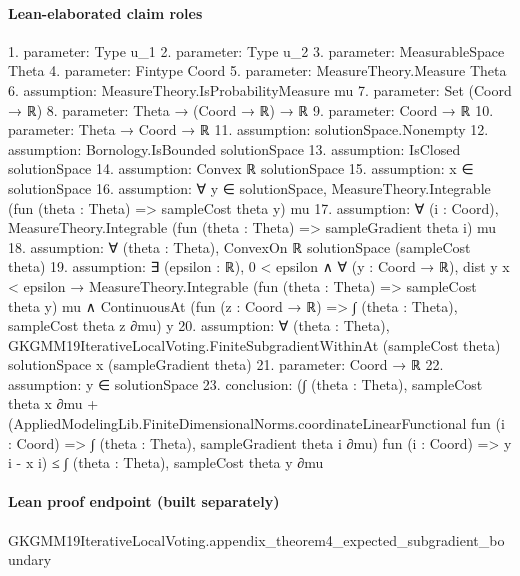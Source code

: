 \documentclass[10pt]{article}
\begin{document}
\paragraph{Lean-elaborated claim roles}\begin{ReviewVerbatim}
1. parameter: Type u_1
2. parameter: Type u_2
3. parameter: MeasurableSpace Theta
4. parameter: Fintype Coord
5. parameter: MeasureTheory.Measure Theta
6. assumption: MeasureTheory.IsProbabilityMeasure mu
7. parameter: Set (Coord → ℝ)
8. parameter: Theta → (Coord → ℝ) → ℝ
9. parameter: Coord → ℝ
10. parameter: Theta → Coord → ℝ
11. assumption: solutionSpace.Nonempty
12. assumption: Bornology.IsBounded solutionSpace
13. assumption: IsClosed solutionSpace
14. assumption: Convex ℝ solutionSpace
15. assumption: x ∈ solutionSpace
16. assumption: ∀ y ∈ solutionSpace, MeasureTheory.Integrable (fun (theta : Theta) => sampleCost theta y) mu
17. assumption: ∀ (i : Coord), MeasureTheory.Integrable (fun (theta : Theta) => sampleGradient theta i) mu
18. assumption: ∀ (theta : Theta), ConvexOn ℝ solutionSpace (sampleCost theta)
19. assumption: ∃ (epsilon : ℝ),
  0 < epsilon ∧
    ∀ (y : Coord → ℝ),
      dist y x < epsilon →
        MeasureTheory.Integrable (fun (theta : Theta) => sampleCost theta y) mu ∧
          ContinuousAt (fun (z : Coord → ℝ) => ∫ (theta : Theta), sampleCost theta z ∂mu) y
20. assumption: ∀ (theta : Theta),
  GKGMM19IterativeLocalVoting.FiniteSubgradientWithinAt (sampleCost theta) solutionSpace x (sampleGradient theta)
21. parameter: Coord → ℝ
22. assumption: y ∈ solutionSpace
23. conclusion: (∫ (theta : Theta), sampleCost theta x ∂mu +
    (AppliedModelingLib.FiniteDimensionalNorms.coordinateLinearFunctional fun (i : Coord) =>
        ∫ (theta : Theta), sampleGradient theta i ∂mu)
      fun (i : Coord) => y i - x i) ≤
  ∫ (theta : Theta), sampleCost theta y ∂mu
\end{ReviewVerbatim}

\paragraph{Lean proof endpoint (built separately)}\begin{ReviewVerbatim}
GKGMM19IterativeLocalVoting.appendix_theorem4_expected_subgradient_boundary
\end{ReviewVerbatim}
\end{document}
